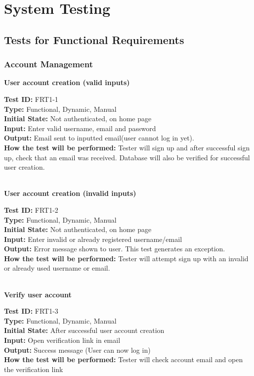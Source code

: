 \documentclass[12pt,fleqn]{article}
\begin{document}
\pagebreak
\section{System Testing}
\subsection{Tests for Functional Requirements}
\subsubsection{Account Management}

\textbf{User account creation (valid inputs)}
\begin{tcolorbox}
\textbf{Test ID:} FRT1-1\\
\textbf{Type:} Functional, Dynamic, Manual\\
\textbf{Initial State:} Not authenticated, on home page\\
\textbf{Input:} Enter valid username, email and password\\
\textbf{Output:} Email sent to inputted email(user cannot log in yet). \\
\textbf{How the test will be performed:} Tester will sign up and after successful sign up, check that an email was received. Database will also be verified for successful user creation.
\end{tcolorbox}

\textbf{\\User account creation (invalid inputs)}
\begin{tcolorbox}
\textbf{Test ID:} FRT1-2\\
\textbf{Type:} Functional, Dynamic, Manual\\
\textbf{Initial State:} Not authenticated, on home page\\
\textbf{Input:} Enter invalid or already registered username/email\\
\textbf{Output:} Error message shown to user.  This test generates an exception.\\
\textbf{How the test will be performed:} Tester will attempt sign up with an invalid or already used username or email.
\end{tcolorbox}

\textbf{\\Verify user account}
\begin{tcolorbox}
\textbf{Test ID:} FRT1-3\\
\textbf{Type:} Functional, Dynamic, Manual\\
\textbf{Initial State:} After successful user account creation\\
\textbf{Input:} Open verification link in email \\
\textbf{Output:} Success message (User can now log in) \\
\textbf{How the test will be performed:} Tester will check account email and open the verification link
\end{tcolorbox}
\end{document}
